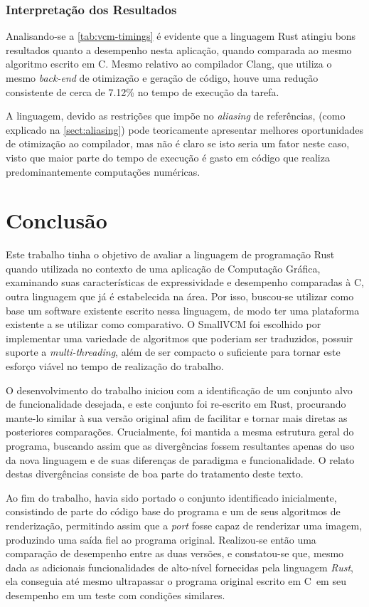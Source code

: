 \documentclass[tg]{mdtufsm}
\def\Cpp{{C\nolinebreak[4]\raisebox{.20ex}{\small\bf++}}}
\begin{document}
\subsection{Interpretação dos Resultados}

Analisando-se a \autoref{tab:vcm-timings} é evidente que a linguagem Rust atingiu bons resultados quanto a desempenho nesta aplicação, quando comparada ao mesmo algoritmo escrito em \Cpp. Mesmo relativo ao compilador Clang, que utiliza o mesmo \emph{back-end} de otimização e geração de código, houve uma redução consistente de cerca de 7.12\% no tempo de execução da tarefa.

A linguagem, devido as restrições que impõe no \emph{aliasing} de referências, (como explicado na \autoref{sect:aliasing}) pode teoricamente apresentar melhores oportunidades de otimização ao compilador, mas não é claro se isto seria um fator neste caso, visto que maior parte do tempo de execução é gasto em código que realiza  predominantemente computações numéricas.

\chapter{Conclusão}

Este trabalho tinha o objetivo de avaliar a linguagem de programação Rust quando utilizada no contexto de uma aplicação de Computação Gráfica, examinando suas características de expressividade e desempenho comparadas à \Cpp, outra linguagem que já é estabelecida na área. Por isso, buscou-se utilizar como base um software existente escrito nessa linguagem, de modo ter uma plataforma existente a se utilizar como comparativo. O SmallVCM foi escolhido por implementar uma variedade de algoritmos que poderiam ser traduzidos, possuir suporte a \emph{multi-threading}, além de ser compacto o suficiente para tornar este esforço viável no tempo de realização do trabalho.

O desenvolvimento do trabalho iniciou com a identificação de um conjunto alvo de funcionalidade desejada, e este conjunto foi re-escrito em Rust, procurando mante-lo similar à sua versão original afim de facilitar e tornar mais diretas as posteriores comparações. Crucialmente, foi mantida a mesma estrutura geral do programa, buscando assim que as divergências fossem resultantes apenas do uso da nova linguagem e de suas diferenças de paradigma e funcionalidade. O relato destas divergências consiste de boa parte do tratamento deste texto.

Ao fim do trabalho, havia sido portado o conjunto identificado inicialmente, consistindo de parte do código base do programa e um de seus algoritmos de renderização, permitindo assim que a \emph{port} fosse capaz de renderizar uma imagem, produzindo uma saída fiel ao programa original. Realizou-se então uma comparação de desempenho entre as duas versões, e constatou-se que, mesmo dada as adicionais funcionalidades de alto-nível fornecidas pela linguagem \emph{Rust}, ela conseguia até mesmo ultrapassar o programa original escrito em \Cpp\ em seu desempenho em um teste com condições similares.
\end{document}
